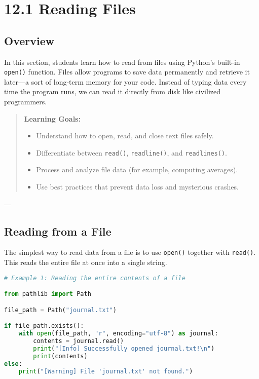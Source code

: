 \chapter{12.1 Reading Files}

\section*{Overview}
In this section, students learn how to read from files using Python's built-in \texttt{open()} function.  
Files allow programs to save data permanently and retrieve it later---a sort of long-term memory for your code.  
Instead of typing data every time the program runs, we can read it directly from disk like civilized programmers.

\begin{quote}
\textbf{Learning Goals:}
\begin{itemize}
  \item Understand how to open, read, and close text files safely.
  \item Differentiate between \texttt{read()}, \texttt{readline()}, and \texttt{readlines()}.
  \item Process and analyze file data (for example, computing averages).
  \item Use best practices that prevent data loss and mysterious crashes.
\end{itemize}
\end{quote}

---

\section{Reading from a File}

The simplest way to read data from a file is to use \texttt{open()} together with \texttt{read()}.
This reads the entire file at once into a single string.

\begin{lstlisting}[language=Python, caption={Reading an entire file safely.}]
# Example 1: Reading the entire contents of a file

from pathlib import Path

file_path = Path("journal.txt")

if file_path.exists():
    with open(file_path, "r", encoding="utf-8") as journal:
        contents = journal.read()
        print("[Info] Successfully opened journal.txt!\n")
        print(contents)
else:
    print("[Warning] File 'journal.txt' not found.")
\end{lstlisting}

